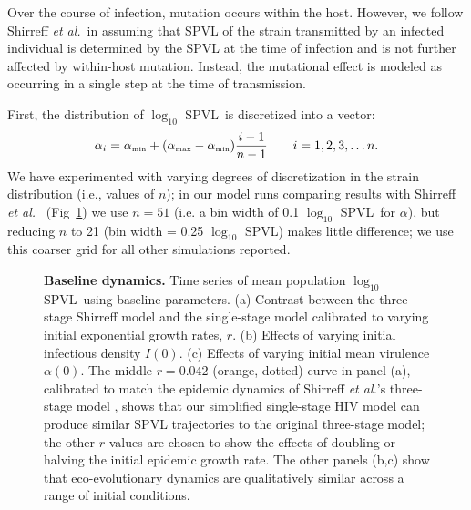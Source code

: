 \documentclass[10pt,letterpaper]{article}
\renewcommand{\figurename}{Fig}
\newcommand{\Lspvl}{$\log_{10}$ SPVL}
\newcommand{\etal}{\textit{et al.}}
\newcommand{\tsub}[2]{#1_{{\textrm{\tiny #2}}}}
\begin{document}
Over the course of infection, mutation occurs within the host. 
However, we follow Shirreff \etal\ in assuming that SPVL of the strain transmitted by an infected 
individual is determined by the SPVL at the time of infection and is not further affected by within-host mutation. 
Instead, the mutational effect is modeled as occurring in a single
step at the time of transmission. 

First, the distribution of \Lspvl\ is discretized into a vector:
\begin{equation}
\alpha_i = \tsub{\alpha}{min} + (\tsub{\alpha}{max} - \tsub{\alpha}{min})\frac{i-1}{n-1} \qquad i = 1,2,3, \dots n.
\end{equation}
We have experimented with varying degrees of discretization in the strain distribution (i.e., values of $n$); in our model runs comparing results with Shirreff \etal\ \cite{shirreff_transmission_2011} (\figurename~\ref{fig:panel3}) we use $n=51$ (i.e. a bin width of 0.1 \Lspvl\ for $\alpha$), but reducing $n$ to 21 (bin width = 0.25 \Lspvl) makes little difference; we use this coarser grid for all other simulations reported.

\begin{figure}[!ht]
\caption{\textbf{Baseline dynamics.}
Time series of mean population \Lspvl\ using baseline parameters.
(a) Contrast between the three-stage Shirreff model and the single-stage model calibrated to varying initial exponential growth rates, $r$.
(b) Effects of varying initial infectious density $I(0)$.
(c) Effects of varying initial mean virulence $\alpha(0)$.
The middle $r=0.042$ (orange, dotted) curve in panel (a), calibrated to match the epidemic dynamics of Shirreff \etal's three-stage model \cite{shirreff_transmission_2011}, shows that our simplified single-stage HIV model can produce similar SPVL trajectories to the original three-stage model; the other $r$ values are chosen to show the effects of doubling or halving the initial epidemic growth rate. The other panels (b,c) show that eco-evolutionary dynamics are qualitatively similar across a range of initial conditions.}
\label{fig:panel3}
\end{figure}
\end{document}
